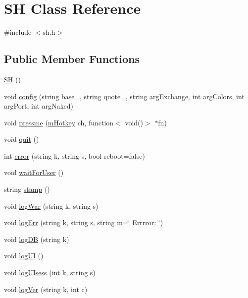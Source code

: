 \hypertarget{class_k_1_1_s_h}{}\section{SH Class Reference}
\label{class_k_1_1_s_h}


{\ttfamily \#include $<$sh.\+h$>$}

\subsection*{Public Member Functions}
\begin{DoxyCompactItemize}
\item 
\hyperlink{class_k_1_1_s_h_a318dc7a3f5064dac8e50e5d9fbd5d75f}{SH} ()
\item 
void \hyperlink{class_k_1_1_s_h_abacd4501fa9314b249f770765816dce5}{config} (string base\+\_\+, string quote\+\_\+, string arg\+Exchange, int arg\+Colors, int arg\+Port, int arg\+Naked)
\item 
void \hyperlink{class_k_1_1_s_h_a4c6bd9d7e5cc908ef96085609e455cb1}{pressme} (\hyperlink{namespace_k_a211862d8b09ec46a051464b6859c1306}{m\+Hotkey} ch, function$<$ void()$>$ $\ast$fn)
\item 
void \hyperlink{class_k_1_1_s_h_a2463a3acef2df4c951ce942a3229e44e}{quit} ()
\item 
int \hyperlink{class_k_1_1_s_h_a4c49d97d050be83fa5908a03c8c47c8a}{error} (string k, string s, bool reboot=false)
\item 
void \hyperlink{class_k_1_1_s_h_ae8fa6fc69497d85bcf25571f2f80f353}{wait\+For\+User} ()
\item 
string \hyperlink{class_k_1_1_s_h_a9467c6fc12388f8513d2f21f76bb7dc7}{stamp} ()
\item 
void \hyperlink{class_k_1_1_s_h_aa6ff36d9cf9124487791c66fe0f121e7}{log\+War} (string k, string s)
\item 
void \hyperlink{class_k_1_1_s_h_a81e184501800070f574e7b688069c3ec}{log\+Err} (string k, string s, string m=\char`\"{} Errrror\+: \char`\"{})
\item 
void \hyperlink{class_k_1_1_s_h_af67052c37f765ca542764f5fcfdde593}{log\+DB} (string k)
\item 
void \hyperlink{class_k_1_1_s_h_aca26ec816d45509907350a56b57ea869}{log\+UI} ()
\item 
void \hyperlink{class_k_1_1_s_h_aeea74b282180b4d73d9855920edecc7f}{log\+U\+Isess} (int k, string s)
\item 
void \hyperlink{class_k_1_1_s_h_a09145551996ba5f25fb67280967aef90}{log\+Ver} (string k, int c)

\end{DoxyCompactItemize}
